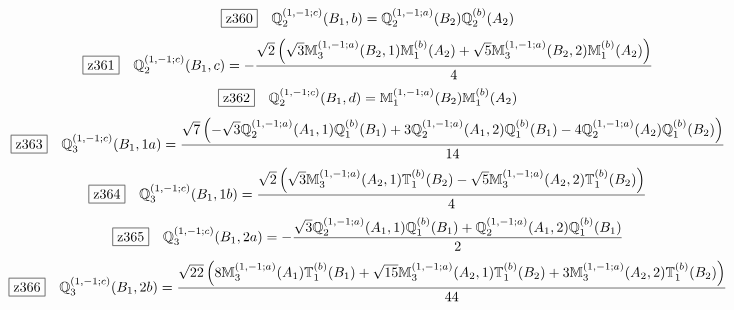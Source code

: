\documentclass[fleqn,10pt,landscape]{jsarticle}
\begin{document}
\begin{dmath*}
\hspace*{3mm}\fbox{z360}\quad \mathbb{Q}_{2}^{(1,-1;c)}(B_{1},b)=\mathbb{Q}_{2}^{(1,-1;a)}(B_{2}) \mathbb{Q}_{2}^{(b)}(A_{2})
\end{dmath*}
\begin{dmath*}
\hspace*{3mm}\fbox{z361}\quad \mathbb{Q}_{2}^{(1,-1;c)}(B_{1},c)=- \frac{\sqrt{2} \left(\sqrt{3} \mathbb{M}_{3}^{(1,-1;a)}(B_{2},1) \mathbb{M}_{1}^{(b)}(A_{2}) + \sqrt{5} \mathbb{M}_{3}^{(1,-1;a)}(B_{2},2) \mathbb{M}_{1}^{(b)}(A_{2})\right)}{4}
\end{dmath*}
\begin{dmath*}
\hspace*{3mm}\fbox{z362}\quad \mathbb{Q}_{2}^{(1,-1;c)}(B_{1},d)=\mathbb{M}_{1}^{(1,-1;a)}(B_{2}) \mathbb{M}_{1}^{(b)}(A_{2})
\end{dmath*}
\begin{dmath*}
\hspace*{3mm}\fbox{z363}\quad \mathbb{Q}_{3}^{(1,-1;c)}(B_{1},1a)=\frac{\sqrt{7} \left(- \sqrt{3} \mathbb{Q}_{2}^{(1,-1;a)}(A_{1},1) \mathbb{Q}_{1}^{(b)}(B_{1}) + 3 \mathbb{Q}_{2}^{(1,-1;a)}(A_{1},2) \mathbb{Q}_{1}^{(b)}(B_{1}) - 4 \mathbb{Q}_{2}^{(1,-1;a)}(A_{2}) \mathbb{Q}_{1}^{(b)}(B_{2})\right)}{14}
\end{dmath*}
\begin{dmath*}
\hspace*{3mm}\fbox{z364}\quad \mathbb{Q}_{3}^{(1,-1;c)}(B_{1},1b)=\frac{\sqrt{2} \left(\sqrt{3} \mathbb{M}_{3}^{(1,-1;a)}(A_{2},1) \mathbb{T}_{1}^{(b)}(B_{2}) - \sqrt{5} \mathbb{M}_{3}^{(1,-1;a)}(A_{2},2) \mathbb{T}_{1}^{(b)}(B_{2})\right)}{4}
\end{dmath*}
\begin{dmath*}
\hspace*{3mm}\fbox{z365}\quad \mathbb{Q}_{3}^{(1,-1;c)}(B_{1},2a)=- \frac{\sqrt{3} \mathbb{Q}_{2}^{(1,-1;a)}(A_{1},1) \mathbb{Q}_{1}^{(b)}(B_{1}) + \mathbb{Q}_{2}^{(1,-1;a)}(A_{1},2) \mathbb{Q}_{1}^{(b)}(B_{1})}{2}
\end{dmath*}
\begin{dmath*}
\hspace*{3mm}\fbox{z366}\quad \mathbb{Q}_{3}^{(1,-1;c)}(B_{1},2b)=\frac{\sqrt{22} \left(8 \mathbb{M}_{3}^{(1,-1;a)}(A_{1}) \mathbb{T}_{1}^{(b)}(B_{1}) + \sqrt{15} \mathbb{M}_{3}^{(1,-1;a)}(A_{2},1) \mathbb{T}_{1}^{(b)}(B_{2}) + 3 \mathbb{M}_{3}^{(1,-1;a)}(A_{2},2) \mathbb{T}_{1}^{(b)}(B_{2})\right)}{44}
\end{dmath*}
\end{document}

